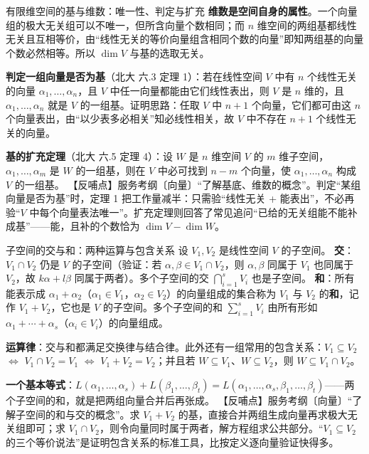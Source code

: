 \begin{fdeep}{有限维空间的基与维数：唯一性、判定与扩充}
\textbf{维数是空间自身的属性}。一个向量组的极大无关组可以不唯一，但所含向量个数相同；而 $n$ 维空间的两组基都线性无关且互相等价，由“线性无关的等价向量组含相同个数的向量”即知两组基的向量个数必然相等。所以 $\dim V$ 与基的选取无关。

\textbf{判定一组向量是否为基}（北大 六.3 定理 1）：若在线性空间 $V$ 中有 $n$ 个线性无关的向量 $\alpha_1,\dots,\alpha_n$，且 $V$ 中任一向量都能由它们线性表出，则 $V$ 是 $n$ 维的，且 $\alpha_1,\dots,\alpha_n$ 就是 $V$ 的一组基。证明思路：任取 $V$ 中 $n+1$ 个向量，它们都可由这 $n$ 个向量表出，由“以少表多必相关”知必线性相关，故 $V$ 中不存在 $n+1$ 个线性无关的向量。

\textbf{基的扩充定理}（北大 六.5 定理 4）：设 $W$ 是 $n$ 维空间 $V$ 的 $m$ 维子空间，$\alpha_1,\dots,\alpha_m$ 是 $W$ 的一组基，则在 $V$ 中必可找到 $n-m$ 个向量，使 $\alpha_1,\dots,\alpha_n$ 构成 $V$ 的一组基。
【反哺点】服务考纲〔向量〕“了解基底、维数的概念”。判定“某组向量是否为基”时，定理 1 把工作量减半：只需验“线性无关 + 能表出”，不必再验“$V$ 中每个向量表法唯一”。扩充定理则回答了常见追问“已给的无关组能不能补成基”——能，且补的个数恰为 $\dim V-\dim W$。
\end{fdeep}

\begin{fdeep}{子空间的交与和：两种运算与包含关系}
设 $V_1,V_2$ 是线性空间 $V$ 的子空间。
\textbf{交}：$V_1\cap V_2$ 仍是 $V$ 的子空间（验证：若 $\alpha,\beta\in V_1\cap V_2$，则 $\alpha,\beta$ 同属于 $V_1$ 也同属于 $V_2$，故 $k\alpha+l\beta$ 同属于两者）。多个子空间的交 $\bigcap_{i=1}^{s}V_i$ 也是子空间。
\textbf{和}：所有能表示成 $\alpha_1+\alpha_2$（$\alpha_1\in V_1$，$\alpha_2\in V_2$）的向量组成的集合称为 $V_1$ 与 $V_2$ 的\textbf{和}，记作 $V_1+V_2$，它也是 $V$ 的子空间。多个子空间的和 $\sum_{i=1}^{s}V_i$ 由所有形如 $\alpha_1+\cdots+\alpha_s$（$\alpha_i\in V_i$）的向量组成。

\textbf{运算律}：交与和都满足交换律与结合律。此外还有一组常用的包含关系：$V_1\subseteq V_2$ $\iff$ $V_1\cap V_2=V_1$ $\iff$ $V_1+V_2=V_2$；并且若 $W\subseteq V_1$、$W\subseteq V_2$，则 $W\subseteq V_1\cap V_2$。

\textbf{一个基本等式}：$L(\alpha_1,\dots,\alpha_s)+L(\beta_1,\dots,\beta_t)=L(\alpha_1,\dots,\alpha_s,\beta_1,\dots,\beta_t)$——两个子空间的和，就是把两组向量合并后再张成。
【反哺点】服务考纲〔向量〕“了解子空间的和与交的概念”。求 $V_1+V_2$ 的基，直接合并两组生成向量再求极大无关组即可；求 $V_1\cap V_2$，则令向量同时属于两者，解方程组求公共部分。“$V_1\subseteq V_2$ 的三个等价说法”是证明包含关系的标准工具，比按定义逐向量验证快得多。
\end{fdeep}

